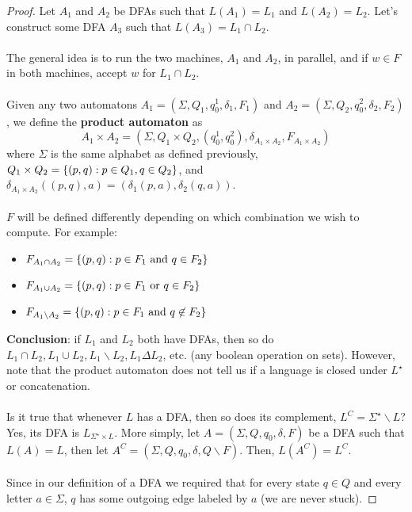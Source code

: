 \documentclass[]{article}
\DeclarePairedDelimiter{\set}{\lbrace}{\rbrace}
\theoremstyle{definition}
\begin{document}
        \begin{proof}
          Let $A_1$ and $A_2$ be DFAs such that $L(A_1) = L_1$ and $L(A_2) = L_2$. Let's construct some DFA $A_3$ such that $L(A_3) = L_1 \cap L_2$.
          \\ \\
          The general idea is to run the two machines, $A_1$ and $A_2$, in parallel, and if $w \in F$ in both machines, accept $w$ for $L_1 \cap L_2$.
          \\ \\
          Given any two automatons $A_1 = (\Sigma, Q_1, q_0^1, \delta_1, F_1)$ and $A_2 = (\Sigma, Q_2, q_0^2, \delta_2, F_2)$, we define the \textbf{product automaton} as
          $$
            A_1 \times A_2 = (\Sigma, Q_1 \times Q_2, (q_0^1, q_0^2), \delta_{A_1 \times A_2}, F_{A_1 \times A_2})
          $$
          where $\Sigma$ is the same alphabet as defined previously, $Q_1 \times Q_2 = \set{ (p, q) : p \in Q_1, q \in Q_2 }$, and $\delta_{A_1 \times A_2}((p, q), a) = (\delta_1(p, a), \delta_2(q, a))$.
          \\ \\
          $F$ will be defined differently depending on which combination we wish to compute. For example:
          \begin{itemize}
            \item $F_{A_1 \cap A_2} = \set{ (p, q) : p \in F_1 \text{ and } q \in F_2 }$
            \item $F_{A_1 \cup A_2} = \set{ (p, q) : p \in F_1 \text{ or } q \in F_2 }$
            \item $F_{A_1 \backslash A_2} = \set{ (p, q) : p \in F_1 \text{ and } q \not \in F_2 }$
          \end{itemize}

          \textbf{Conclusion}: if $L_1$ and $L_2$ both have DFAs, then so do $L_1 \cap L_2, L_1 \cup L_2, L_1 \backslash L_2, L_1 \Delta L_2$, etc. (any boolean operation on sets). However, note that the product automaton does not tell us if a language is closed under $L^\star$ or concatenation.
          \\ \\
          Is it true that whenever $L$ has a DFA, then so does its complement, $L^C = \Sigma^\star \backslash L$? Yes, its DFA is $L_{\Sigma^\star \times L}$. More simply, let $A = (\Sigma, Q, q_0, \delta, F)$ be a DFA such that $L(A) = L$, then let $A^C = (\Sigma, Q, q_0, \delta, Q \backslash F)$. Then, $L(A^C) = L^C$.
          \\ \\
          Since in our definition of a DFA we required that for every state $q \in Q$ and every letter $a \in \Sigma$, $q$ has some outgoing edge labeled by $a$ (we are never stuck).
        \end{proof}
\end{document}
